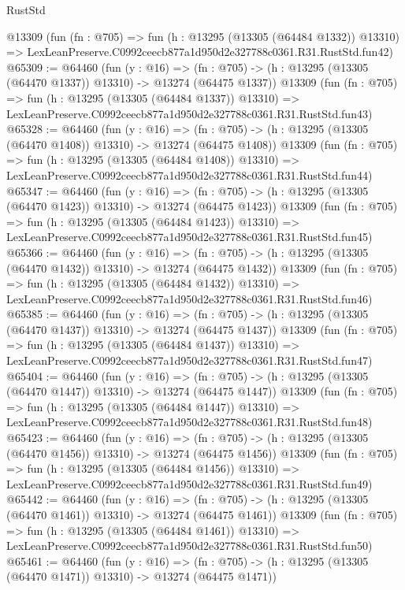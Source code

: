 \begin{lexlean}{RustStd}
\begin{coremodule}
    @13309
    (fun (fn : @705) =>
    fun (h : @13295 (@13305 (@64484 @1332)) @13310) =>
    LexLeanPreserve.C0992ceecb877a1d950d2e327788c0361.R31.RustStd.fun42)
@65309 := @64460
    (fun (y : @16) =>
    (fn : @705) -> (h : @13295 (@13305 (@64470 @1337)) @13310) -> @13274 (@64475 @1337))
    @13309
    (fun (fn : @705) =>
    fun (h : @13295 (@13305 (@64484 @1337)) @13310) =>
    LexLeanPreserve.C0992ceecb877a1d950d2e327788c0361.R31.RustStd.fun43)
@65328 := @64460
    (fun (y : @16) =>
    (fn : @705) -> (h : @13295 (@13305 (@64470 @1408)) @13310) -> @13274 (@64475 @1408))
    @13309
    (fun (fn : @705) =>
    fun (h : @13295 (@13305 (@64484 @1408)) @13310) =>
    LexLeanPreserve.C0992ceecb877a1d950d2e327788c0361.R31.RustStd.fun44)
@65347 := @64460
    (fun (y : @16) =>
    (fn : @705) -> (h : @13295 (@13305 (@64470 @1423)) @13310) -> @13274 (@64475 @1423))
    @13309
    (fun (fn : @705) =>
    fun (h : @13295 (@13305 (@64484 @1423)) @13310) =>
    LexLeanPreserve.C0992ceecb877a1d950d2e327788c0361.R31.RustStd.fun45)
@65366 := @64460
    (fun (y : @16) =>
    (fn : @705) -> (h : @13295 (@13305 (@64470 @1432)) @13310) -> @13274 (@64475 @1432))
    @13309
    (fun (fn : @705) =>
    fun (h : @13295 (@13305 (@64484 @1432)) @13310) =>
    LexLeanPreserve.C0992ceecb877a1d950d2e327788c0361.R31.RustStd.fun46)
@65385 := @64460
    (fun (y : @16) =>
    (fn : @705) -> (h : @13295 (@13305 (@64470 @1437)) @13310) -> @13274 (@64475 @1437))
    @13309
    (fun (fn : @705) =>
    fun (h : @13295 (@13305 (@64484 @1437)) @13310) =>
    LexLeanPreserve.C0992ceecb877a1d950d2e327788c0361.R31.RustStd.fun47)
@65404 := @64460
    (fun (y : @16) =>
    (fn : @705) -> (h : @13295 (@13305 (@64470 @1447)) @13310) -> @13274 (@64475 @1447))
    @13309
    (fun (fn : @705) =>
    fun (h : @13295 (@13305 (@64484 @1447)) @13310) =>
    LexLeanPreserve.C0992ceecb877a1d950d2e327788c0361.R31.RustStd.fun48)
@65423 := @64460
    (fun (y : @16) =>
    (fn : @705) -> (h : @13295 (@13305 (@64470 @1456)) @13310) -> @13274 (@64475 @1456))
    @13309
    (fun (fn : @705) =>
    fun (h : @13295 (@13305 (@64484 @1456)) @13310) =>
    LexLeanPreserve.C0992ceecb877a1d950d2e327788c0361.R31.RustStd.fun49)
@65442 := @64460
    (fun (y : @16) =>
    (fn : @705) -> (h : @13295 (@13305 (@64470 @1461)) @13310) -> @13274 (@64475 @1461))
    @13309
    (fun (fn : @705) =>
    fun (h : @13295 (@13305 (@64484 @1461)) @13310) =>
    LexLeanPreserve.C0992ceecb877a1d950d2e327788c0361.R31.RustStd.fun50)
@65461 := @64460
    (fun (y : @16) =>
    (fn : @705) -> (h : @13295 (@13305 (@64470 @1471)) @13310) -> @13274 (@64475 @1471))

\end{coremodule}
\end{lexlean}
